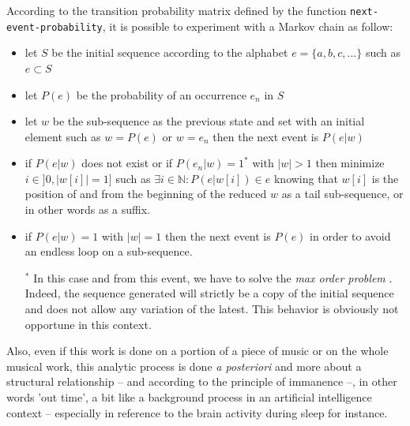 \noindent
\begin{info}
\begin{minipage}{0.95\textwidth}
\vspace{0.25cm}
According to the transition probability matrix defined by the function \texttt{next-event-probability}, it is possible to experiment with a Markov chain as follow:
\begin{itemize}[leftmargin=0.45cm]
  \item let $S$ be the initial sequence according to the alphabet $e=\{a,b,c,...\}$ such as $e \subset S$
  \item let $P(e)$ be the probability of an occurrence $e_n$ in $S$
  \item let $w$ be the sub-sequence as the previous state and set with an initial element such as $w=P(e)$ or $w=e_n$ then the next event is $P(e|w)$
  \item if $P(e|w)$ does not exist or if $P(e_n|w)=1^*$ with $|w|>1$ then minimize $i \in ]0, |w[i]|=1]$ such as $\exists i \in \mathbb{N}:P(e|w[i]) \in e$ knowing that $w[i]$ is the position of and from the beginning of the reduced $w$ as a tail sub-sequence, or in other words as a suffix.
  \item if $P(e|w)=1$ with $|w|=1$ then the next event is $P(e)$ in order to avoid an endless loop on a sub-sequence. 
    \vspace{0.2cm}
\begin{spacing}{1.0}
\footnotesize $^*$ In this case and from this event, we have to solve the \textit{max order problem} \citep{mop}. Indeed, the sequence generated will strictly be a copy of the initial sequence and does not allow any variation of the latest. This behavior is obviously not opportune in this context.
\end{spacing}
\end{itemize}
\end{minipage}
\end{info}
\label{am:mc}

Also, even if this work is done on a portion of a piece of music or on the whole musical work, this analytic process is done \textit{a posteriori} and more about a structural relationship -- and according to the principle of immanence --, in other words 'out time', a bit like a background process in an artificial intelligence context -- especially in reference to the brain activity during sleep for instance.

